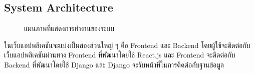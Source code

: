 \documentclass[12pt,oneside,openright,a4paper]{cpe-thai-project}
\begin{document}
\subsection{System Architecture}

\begin{figure}[!h]\centering
	\caption{แผนภาพที่แสดงการทำงานของระบบ}\label{fig:UseCaseDiagram}
\end{figure}

\hspace{1cm}
  ในเว็บแอปพลิเคชันจะแบ่งเป็นสองส่วนใหญ่ ๆ คือ Frontend และ Backend โดยผู้ใช้จะติดต่อกับเว็บแอปพลิเคชันผ่านทาง
Frontend ที่พัฒนาโดยใช้ React.js และ Frontend จะติดต่อกับ Backend ที่พัฒนาโดยใช้ Django และ Django
จะรับหน้าที่ในการติดต่อกับฐานข้อมูล





\makeatletter
\g@addto@macro{\UrlBreaks}{\UrlOrds}
\makeatother
% 



\end{document}

